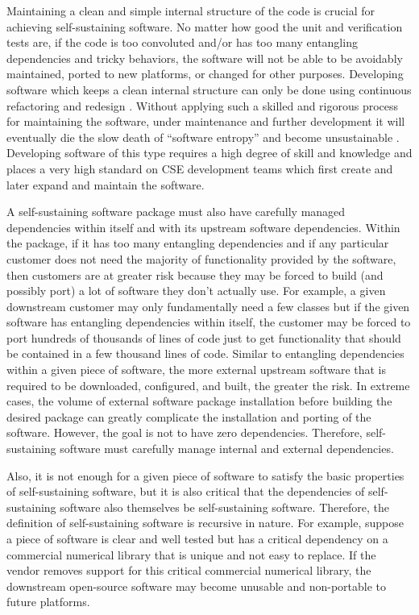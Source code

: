 \documentclass[11pt]{SANDreport}
\begin{document}
Maintaining a clean and simple internal structure of the code is
crucial for achieving self-sustaining software.  No matter how good
the unit and verification tests are, if the code is too convoluted
and/or has too many entangling dependencies and tricky behaviors, the
software will not be able to be avoidably maintained, ported to new
platforms, or changed for other purposes.  Developing software which
keeps a clean internal structure can only be done using continuous
refactoring and redesign {}\cite{XP2}.  Without applying such a
skilled and rigorous process for maintaining the software, under
maintenance and further development it will eventually die the slow
death of ``software entropy'' and become unsustainable
{}\cite{MythicalManMonth95}.  Developing software of this type
requires a high degree of skill and knowledge and places a very high
standard on CSE development teams which first create and later expand
and maintain the software.

A self-sustaining software package must also have carefully managed dependencies
within itself and with its upstream software dependencies.  Within the
package, if it has too many entangling dependencies and
if any particular customer does not need the majority of functionality
provided by the software, then customers are at greater risk because
they may be forced to build (and possibly port) a lot of software they
don't actually use.  For example, a given downstream customer may only
fundamentally need a few classes but if the given software has
entangling dependencies within itself, the customer may be forced to
port hundreds of thousands of lines of code just to get functionality
that should be contained in a few thousand lines of code.  Similar to entangling
dependencies within a given piece of software, the more external
upstream software that is required to be downloaded, configured, and
built, the greater the risk.  In extreme cases, the volume of
external software package installation before building
the desired package can greatly complicate the installation and porting of the software.  However, the goal is not
to have zero dependencies.  Therefore, self-sustaining software must
carefully manage internal and external dependencies.

Also, it is not enough for a given piece of software to satisfy the
basic properties of self-sustaining software, but it is also critical
that the dependencies of self-sustaining software also themselves be
self-sustaining software. Therefore, the definition of self-sustaining
software is recursive in nature.  For example, suppose a piece of
software is clear and well tested but has a critical dependency on a
commercial numerical library that is unique and not easy to replace.
If the vendor removes support for this critical commercial numerical
library, the downstream open-source software may become unusable and
non-portable to future platforms.
\end{document}
